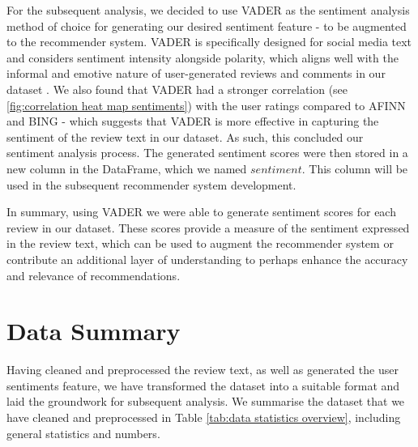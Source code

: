 For the subsequent analysis, we decided to use VADER as the sentiment analysis method of choice for generating our desired sentiment feature - to be augmented to the recommender system. VADER is  specifically designed for social media text and considers sentiment intensity alongside polarity, which aligns well with the informal and emotive nature of user-generated reviews and comments in our dataset \cite{singh2020sentiment}. We also found that VADER had a stronger correlation (see \ref{fig:correlation heat map sentiments}) with the user ratings compared to AFINN and BING - which suggests that VADER is more effective in capturing the sentiment of the review text in our dataset. As such, this concluded our sentiment analysis process. The generated sentiment scores were then stored in a new column in the DataFrame, which we named $sentiment$. This column will be used in the subsequent recommender system development.

In summary, using VADER we were able to generate sentiment scores for each review in our dataset. These scores provide a measure of the sentiment expressed in the review text, which can be used to augment the recommender system or contribute an additional layer of understanding to perhaps enhance the accuracy and relevance of recommendations.


\section{Data Summary}
\label{sec:3 Data Summary}

Having cleaned and preprocessed the review text, as well as generated the user sentiments feature, we have transformed the dataset into a suitable format and laid the groundwork for subsequent analysis. We summarise the dataset that we have cleaned and preprocessed in Table \ref{tab:data statistics overview}, including general statistics and numbers.

